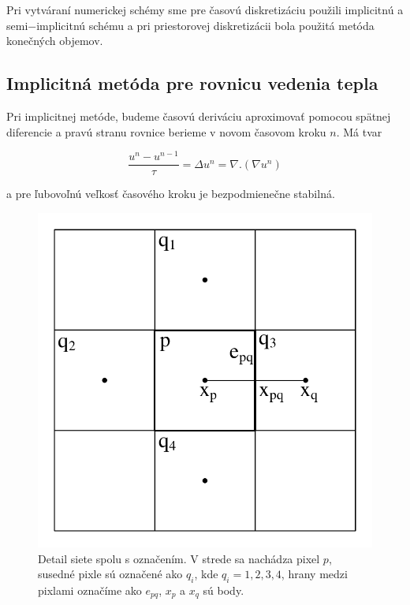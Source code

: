 \documentclass[a4paper,12pt,twoside]{article}%
\begin{document}
Pri vytváraní numerickej schémy sme pre časovú diskretizáciu použili implicitnú a semi$-$implicitnú schému a pri priestorovej diskretizácii bola použitá metóda konečných objemov.



\subsection{Implicitná metóda pre rovnicu vedenia tepla}

Pri implicitnej metóde, budeme časovú deriváciu aproximovať pomocou spätnej diferencie a pravú stranu rovnice berieme v novom časovom kroku $n$. Má tvar

\begin{equation} \label{eq:ihe}
\frac{u^n - u^{n-1}}{\tau} = \Delta u^n = \nabla . (\nabla u^n)
\end{equation}

a pre ľubovoľnú veľkosť časového kroku je bezpodmienečne stabilná. 

\begin{figure}[h!]
 \begin{center} 
 \includegraphics[scale=0.40]{pics/hrany1.pdf}
\caption{Detail siete spolu s označením. V strede sa nachádza pixel $p$, susedné pixle sú označené ako $q_i$, kde $q_i = 1, 2, 3, 4$, hrany medzi pixlami označíme ako $e_{pq}$, $x_p$ a $x_q$ sú body. }
\label{fig:hrany}
\end{center} 
\end{figure}
\end{document}
